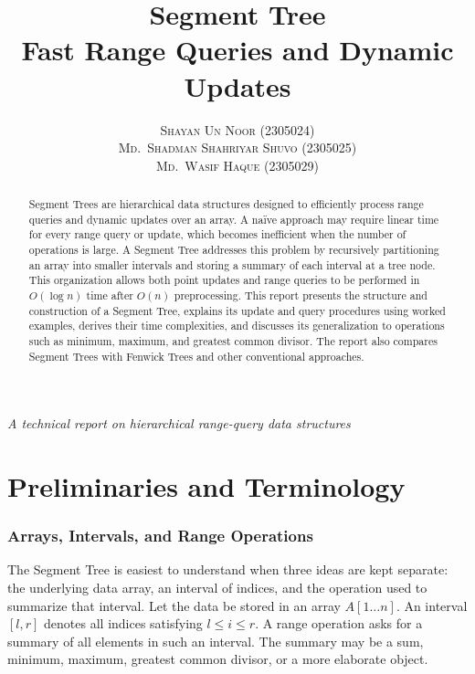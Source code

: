 \documentclass[11pt,open=any]{scrreprt}
\title{\textbf{\huge Segment Tree}\\[4pt]\large Fast Range Queries and Dynamic Updates}
\author{\textsc{Shayan Un Noor} (2305024) \\ \textsc{Md.\ Shadman Shahriyar Shuvo} (2305025) \\ \textsc{Md.\ Wasif Haque} (2305029)}
\date{}
\begin{document}
\maketitle
\thispagestyle{empty}
\vfill
\begin{center}
\textit{A technical report on hierarchical range-query data structures}
\end{center}
\clearpage
{}
\tableofcontents
\listoffigures
\listoftables
\clearpage
{}

\begin{abstract}
\noindent Segment Trees are hierarchical data structures designed to efficiently process range queries and dynamic updates over an array. A na\"ive approach may require linear time for every range query or update, which becomes inefficient when the number of operations is large. A Segment Tree addresses this problem by recursively partitioning an array into smaller intervals and storing a summary of each interval at a tree node. This organization allows both point updates and range queries to be performed in $O(\log n)$ time after $O(n)$ preprocessing. This report presents the structure and construction of a Segment Tree, explains its update and query procedures using worked examples, derives their time complexities, and discusses its generalization to operations such as minimum, maximum, and greatest common divisor. The report also compares Segment Trees with Fenwick Trees and other conventional approaches.
\end{abstract}

\chapter{Preliminaries and Terminology}

\subsection{Arrays, Intervals, and Range Operations}
The Segment Tree is easiest to understand when three ideas are kept separate: the underlying data array, an interval of indices, and the operation used to summarize that interval. Let the data be stored in an array $A[1\ldots n]$. An interval $[l,r]$ denotes all indices satisfying $l\leq i\leq r$. A range operation asks for a summary of all elements in such an interval. The summary may be a sum, minimum, maximum, greatest common divisor, or a more elaborate object.
\end{document}
